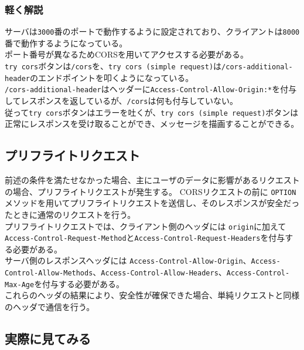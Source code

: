 \subsubsection{軽く解説}\label{ux8efdux304fux89e3ux8aac}

サーバは\texttt{3000}番のポートで動作するように設定されており、クライアントは\texttt{8000}番で動作するようになっている。\\
ポート番号が異なるためCORSを用いてアクセスする必要がある。\\
\texttt{try\ cors}ボタンは\texttt{/cors}を、\texttt{try\ cors\ (simple\ request)}は\texttt{/cors-additional-header}のエンドポイントを叩くようになっている。\\
\texttt{/cors-additional-header}はヘッダーに\texttt{Access-Control-Allow-Origin:*}を付与してレスポンスを返しているが、\texttt{/cors}は何も付与していない。\\
従って\texttt{try\ cors}ボタンはエラーを吐くが、\texttt{try\ cors\ (simple\ request)}ボタンは正常にレスポンスを受け取ることができ、メッセージを描画することができる。

\subsection{プリフライトリクエスト}\label{ux30d7ux30eaux30d5ux30e9ux30a4ux30c8ux30eaux30afux30a8ux30b9ux30c8}

前述の条件を満たせなかった場合、主にユーザのデータに影響があるリクエストの場合、プリフライトリクエストが発生する。
CORSリクエストの前に
\texttt{OPTION}メソッドを用いてプリフライトリクエストを送信し、そのレスポンスが安全だったときに通常のリクエストを行う。\\
プリフライトリクエストでは、クライアント側のヘッダには
\texttt{origin}に加えて
\texttt{Access-Control-Request-Method}と\texttt{Access-Control-Request-Headers}を付与する必要がある。\\
サーバ側のレスポンスヘッダには
\texttt{Access-Control-Allow-Origin}、\texttt{Access-Control-Allow-Methods}、\texttt{Access-Control-Allow-Headers}、\texttt{Access-Control-Max-Age}を付与する必要がある。\\
これらのヘッダの結果により、安全性が確保できた場合、単純リクエストと同様のヘッダで通信を行う。

\subsection{実際に見てみる}\label{ux5b9fux969bux306bux898bux3066ux307fux308b-2}

